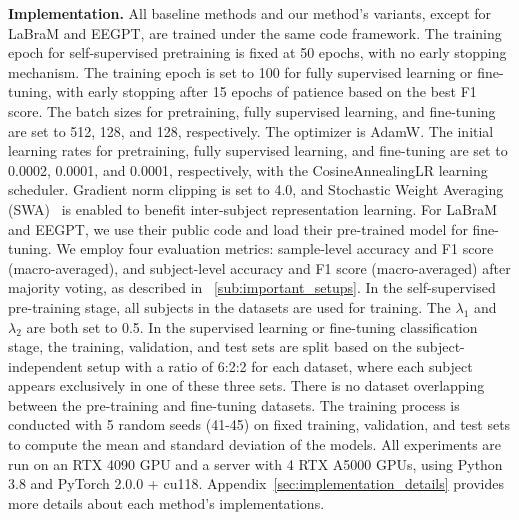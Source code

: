 \textbf{Implementation.}
All baseline methods and our method's variants, except for LaBraM and EEGPT, are trained under the same code framework. The training epoch for self-supervised pretraining is fixed at 50 epochs, with no early stopping mechanism. The training epoch is set to 100 for fully supervised learning or fine-tuning, with early stopping after 15 epochs of patience based on the best F1 score. The batch sizes for pretraining, fully supervised learning, and fine-tuning are set to 512, 128, and 128, respectively. The optimizer is AdamW. The initial learning rates for pretraining, fully supervised learning, and fine-tuning are set to 0.0002, 0.0001, and 0.0001, respectively, with the CosineAnnealingLR learning scheduler. Gradient norm clipping is set to 4.0, and Stochastic Weight Averaging (SWA)~\cite{izmailov2018averaging} is enabled to benefit inter-subject representation learning. For LaBraM and EEGPT, we use their public code and load their pre-trained model for fine-tuning. We employ four evaluation metrics: sample-level accuracy and F1 score (macro-averaged), and subject-level accuracy and F1 score (macro-averaged) after majority voting, as described in ~\ref{sub:important_setups}. In the self-supervised pre-training stage, all subjects in the datasets are used for training. The ${\lambda_1}$ and ${\lambda_2}$ are both set to 0.5. In the supervised learning or fine-tuning classification stage, the training, validation, and test sets are split based on the subject-independent setup with a ratio of 6:2:2 for each dataset, where each subject appears exclusively in one of these three sets. There is no dataset overlapping between the pre-training and fine-tuning datasets. The training process is conducted with 5 random seeds (41-45) on fixed training, validation, and test sets to compute the mean and standard deviation of the models. All experiments are run on an RTX 4090 GPU and a server with 4 RTX A5000 GPUs, using Python 3.8 and PyTorch 2.0.0 + cu118. Appendix~\ref{sec:implementation_details} provides more details about each method's implementations.
